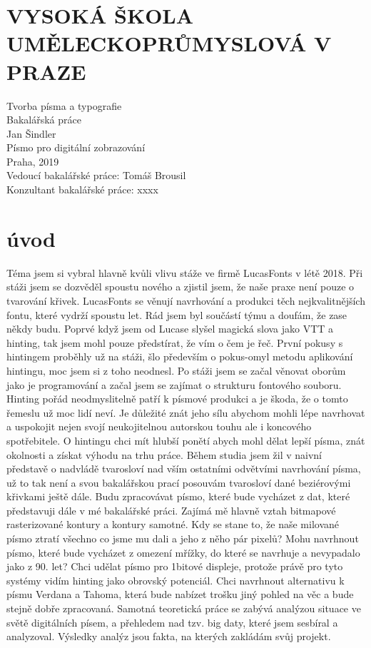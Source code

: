 \documentclass[a4paper]{article}
\begin{document}
\section*{VYSOKÁ ŠKOLA\\UMĚLECKOPRŮMYSLOVÁ V PRAZE}
Tvorba písma a typografie\\
Bakalářská práce\\
Jan Šindler\\
\vspace{20mm}
Písmo pro digitální zobrazování\\
\vfill
Praha, 2019\\
Vedoucí bakalářské práce: Tomáš Brousil\\
Konzultant bakalářské práce: xxxx\\

\section{úvod}
Téma jsem si vybral hlavně kvůli vlivu stáže ve firmě LucasFonts v létě 2018. Při stáži jsem se dozvěděl spoustu nového a zjistil jsem, že naše praxe není pouze o tvarování křivek. LucasFonts se věnují navrhování a produkci těch nejkvalitnějších fontu, které vydrží spoustu let. Rád jsem byl součástí týmu a doufám, že zase někdy budu. Poprvé když jsem od Lucase slyšel magická slova jako VTT a hinting, tak jsem mohl pouze předstírat, že vím o čem je řeč. První pokusy s hintingem proběhly už na stáži, šlo především o pokus-omyl metodu aplikování hintingu, moc jsem si z toho neodnesl. Po stáži jsem se začal věnovat oborům jako je programování a začal jsem se zajímat o strukturu fontového souboru. Hinting pořád neodmyslitelně patří k písmové produkci a je škoda, že o tomto řemeslu už moc lidí neví. Je důležité znát jeho sílu abychom mohli lépe navrhovat a uspokojit nejen svojí neukojitelnou autorskou touhu ale i koncového spotřebitele. O hintingu chci mít hlubší ponětí abych mohl dělat lepší písma, znát okolnosti a získat výhodu na trhu práce. Během studia jsem žil v naivní představě o nadvládě tvarosloví nad vším ostatními odvětvími navrhování písma, už to tak není a svou bakalářskou prací posouvám tvarosloví dané beziérovými křivkami ještě dále. Budu zpracovávat písmo, které bude vycházet z dat, které představuji dále v mé bakalářské práci. Zajímá mě hlavně vztah bitmapové rasterizované kontury a kontury samotné. Kdy se stane to, že naše milované písmo ztratí všechno co jsme mu dali a jeho z něho pár pixelů? Mohu navrhnout písmo, které bude vycházet z omezení mřížky, do které se navrhuje a nevypadalo jako z 90. let? Chci udělat písmo pro 1bitové displeje, protože právě pro tyto systémy vidím hinting jako obrovský potenciál. Chci navrhnout alternativu k písmu Verdana a Tahoma, která bude nabízet trošku jiný pohled na věc a bude stejně dobře zpracovaná. Samotná teoretická práce se zabývá analýzou situace ve světě digitálních písem, a přehledem nad tzv. big daty, které jsem sesbíral a analyzoval. Výsledky analýz jsou fakta, na kterých zakládám svůj projekt.
\end{document}
